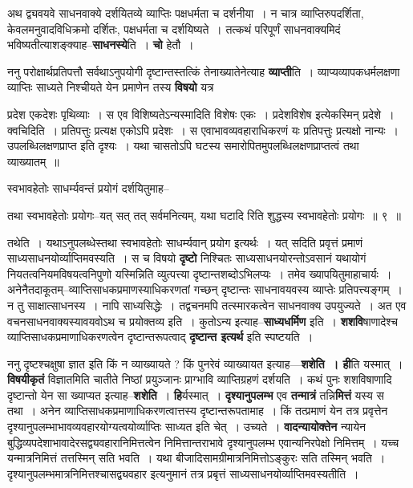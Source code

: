 \documentclass[article,12pt,a4paper]{memoir}
\begin{document}
	  \pstart अथ द्व्यवयवे साधनवाक्ये दर्शयितव्ये व्याप्तिः पक्षधर्मता च दर्शनीया । न चात्र व्याप्तिरुपदर्शिता, केवलमनुवादविधिक्रमो दर्शितः, पक्षधर्मता च दर्शयिष्यते । तत्कथं परिपूर्णं साधनवाक्यमिदं भविष्यतीत्याशङ्क्याह--\textbf{साधनस्ये}ति । \textbf{चो} हेतौ ।
	\pend
      

	  \pstart ननु परोक्षार्थप्रतिपत्तौ सर्वथाऽनुपयोगी दृष्टान्तस्तत्किं तेनाख्यातेनेत्याह \textbf{व्याप्ती}ति । व्याप्यव्यापकधर्मलक्षणा \leavevmode{} व्याप्तिः साध्यते निश्चीयते येन प्रमाणेन तस्य \textbf{विषयो} यत्र  \leavevmode{} 
	  
	प्रदेश एकदेशः पृथिव्याः । स एव विशिष्यतेऽन्यस्मादिति विशेषः एकः । प्रदेशविशेष इत्येकस्मिन् प्रदेशे । क्वचिदिति । प्रतिपत्तुः प्रत्यक्ष एकोऽपि प्रदेशः । स एवाभावव्यवहाराधिकरणं यः प्रतिपत्तुः प्रत्यक्षो नान्यः । उपलब्धिलक्षणप्राप्त इति दृश्यः । यथा चासतोऽपि घटस्य समारोपितमुपलब्धिलक्षणप्राप्तत्वं तथा व्याख्यातम् ॥  
	  
	स्वभावहेतोः साधर्म्यवन्तं प्रयोगं दर्शयितुमाह--  
	  
	तथा स्वभावहेतोः प्रयोगः--यत् सत् तत् सर्वमनित्यम्, यथा घटादि रिति शुद्धस्य स्वभावहेतोः प्रयोगः ॥ ९ ॥ 
	  
	तथेति । यथाऽनुपलब्धेस्तथा स्वभावहेतोः साधर्म्यवान् प्रयोग इत्यर्थः । यत् सदिति प्रवृत्तं प्रमाणं साध्यसाधनयोर्व्याप्तिमवस्यति । स च विषयो \textbf{दृष्टो} निश्चितः साध्यसाधनयोरन्तोऽवसानं यथायोगं नियतत्वनियमविषयत्वनिपुणो यस्मिन्निति व्युत्पत्त्या दृष्टान्तशब्दोऽभिलप्यः । तमेव ख्यापयितुमाहाचार्यः । अनेनैतदाकूतम्--व्याप्तिसाधकप्रमाणस्याधिकरणतां गच्छन् दृष्टान्तः साधनावयवस्य व्याप्तेः प्रतिपत्त्यङ्गम् । न तु साक्षात्साधनस्य । नापि साध्यसिद्धेः । तद्वचनमपि तत्स्मारकत्वेन साधनवाक्य उपयुज्यते । अत एव वचनसाधनवाक्यस्यावयवोऽथ च प्रयोक्तव्य इति । कुतोऽन्य इत्याह--\textbf{साध्यधर्मिण} इति । \textbf{शशवि}षाणादेश्च व्याप्तिसाधकप्रमाणाधिकरणत्वेन दृष्टान्तरूपत्वाद् \textbf{दृष्टान्त इत्यर्थ} इति स्पष्टयति ।
	\pend
      

	  \pstart ननु दृष्टश्चक्षुषा ज्ञात इति किं न व्याख्यायते ? किं पुनरेवं व्याख्यायत इत्याह—\textbf{शशेति । ही}ति यस्मात् । \textbf{विषयीकृतं} विज्ञातमिति चातीते निष्ठां प्रयुञ्जानः प्राग्भावि व्याप्तिग्रहणं दर्शयति । कथं पुनः शशविषाणादि दृष्टान्तो येन सा ख्याप्यत इत्याह--\textbf{शशेति} । \textbf{हि}र्यस्मात् । \textbf{दृश्यानुपलम्भ} एव \textbf{तन्मात्रं} तन्नि\textbf{मित्तं} यस्य स तथा । अनेन व्याप्तिसाधकप्रमाणाधिकरणत्वात्तस्य दृष्टान्तरूपतामाह । किं तत्प्रमाणं येन तत्र प्रवृत्तेन दृश्यानुपलम्भाभावव्यवहारयोग्यत्वयोर्व्याप्तिः साध्यत इति चेत् । उच्यते । \textbf{वादन्यायोक्तेन} न्यायेन बुद्धिव्यपदेशाभावादेरसद्व्यवहारानिमित्तत्वेन निमित्तान्तराभावे दृश्यानुपलम्भ एवान्यनिरपेक्षो निमित्तम् । यच्च यन्मात्रनिमित्तं तत्तस्मिन् सति भवति । यथा बीजादिसामग्रीमात्रनिमित्तोऽङ्कुरः सति तस्मिन् भवति । दृश्यानुपलम्भमात्रनिमित्तश्चासद्व्यवहार इत्यनुमानं तत्र प्रबृत्तं साध्यसाधनयोर्व्याप्तिमवस्यतीति ।
	\pend
      
\end{document}
